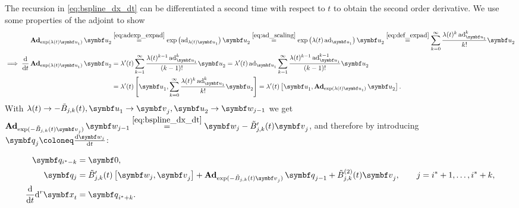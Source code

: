 The recursion in \eqref{eq:bspline_dx_dt} can be differentiated a second time with respect to $t$ to obtain the second order derivative. We use some properties of the adjoint to show
\begin{equation}
  \begin{aligned}
    \bAd_{\exp(\lambda(t) \bu_1)} \bu_2
     & \overset{\eqref{eq:adexp_expad}}= \exp \left( \ad_{\lambda(t) \bu_1} \right) \bu_2 \overset{\eqref{eq:ad_scaling}}= \exp \left( \lambda(t) \ad_{\bu_1} \right) \bu_2 \overset{\eqref{eq:def_expad}}= \sum_{k=0}^\infty \frac{\lambda(t)^k \ad_{\bu_1}^k  }{k!} \bu_2 \\
    \implies \frac{\mathrm{d}}{\mathrm{d}t} \bAd_{\exp(\lambda(t) \bu_1)} \bu_2
     & = \lambda'(t) \sum_{k=1}^\infty \frac{\lambda(t)^{k-1} \ad_{\bu_1}^k }{(k-1)!} \bu_2 = \lambda'(t) \ad_{\bu_1} \sum_{k=1}^\infty \frac{\lambda(t)^{k-1} \ad_{\bu_1}^{k-1} }{(k-1)!}\bu_2                                                                             \\
     & = \lambda'(t) \left[ \bu_1, \sum_{k=0}^\infty \frac{\lambda(t)^k \ad_{\bu_1}^k}{k!} \bu_2 \right]                                                                                   =  \lambda'(t) \left[ \bu_1, \bAd_{\exp(\lambda(t) \bu_1)} \bu_2 \right].
  \end{aligned}
\end{equation}
With $\lambda(t) \rightarrow - \tilde B_{j, k}(t), \bu_1 \rightarrow \bv_j, \bu_2 \rightarrow \symbf w_{j-1}$ we get $\bAd_{\exp(-\tilde B_{j, k}(t) \bv_j)} \symbf w_{j-1} \overset{\eqref{eq:bspline_dx_dt}}= \symbf w_j - \tilde B_{j, k}'(t) \bv_j$, and therefore by introducing $\bq_j \coloneq \frac{\mathrm{d} \symbf w_j}{\mathrm{d} t}$:
\begin{important}
  \begin{equation}
    \begin{aligned}
      \symbf q_{i^* - k} & = \symbf 0,                                                                                                                                                                        \\
      \symbf q_j         & = \tilde B_{j, k}'(t) \left[ \symbf w_j, \bv_j \right]  + \bAd_{\exp(-\tilde B_{j, k}(t) \bv_j )} \bq_{j-1} + \tilde B^{(2)}_{j, k}(t) \bv_j, \qquad j = i^* + 1, \ldots, i^* + k, \\
      \frac{\mathrm{d}}{\mathrm{d}t} \mathrm{d}^r \x_t
                         & = \bq_{i^* + k}.
    \end{aligned}
  \end{equation}
\end{important}

